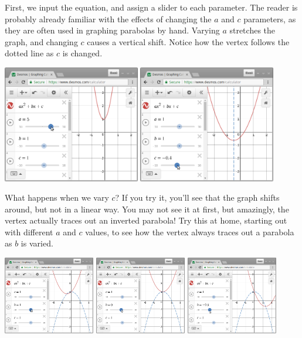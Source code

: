 \documentclass[man, 12pt]{apa6}
\begin{document}
\noindent First, we input the equation, and assign a slider to each parameter. 
The reader is probably already familiar with the effects of changing the $a$ and $c$ parameters, as they are often used in graphing parabolas by hand. Varying $a$ stretches the graph, and changing $c$ causes a vertical shift. Notice how the vertex follows the dotted line as $c$ is changed. 
\begin{center}
\includegraphics[width=0.45\textwidth]{desmos_2}
\includegraphics[width=0.45\textwidth]{desmos_3}
\end{center}
What happens when we vary $c$? If you try it, you'll see that the graph shifts around, but not in a linear way. You may not see it at first, but amazingly, the vertex actually traces out an inverted parabola! Try this at home, starting out with different $a$ and $c$ values, to see how the vertex always traces out a parabola as $b$ is varied. 
\begin{center}
\includegraphics[width=0.3\textwidth]{desmos_4}
\includegraphics[width=0.3\textwidth]{desmos_5}
\includegraphics[width=0.3\textwidth]{desmos_6}
\end{center}
\end{document}
